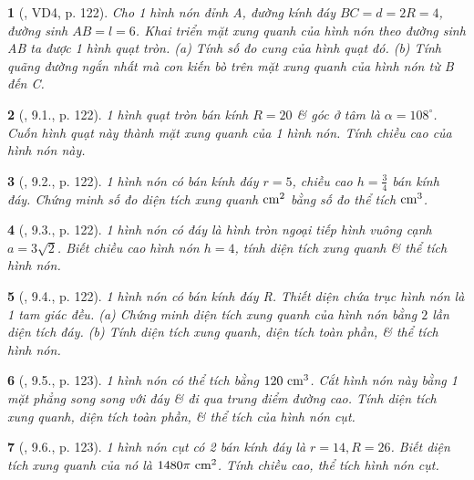 \documentclass{article}
\newtheorem{baitoan}{}
\begin{document}
\begin{baitoan}[\cite{Binh_boi_duong_Toan_9_tap_2}, VD4, p. 122]
	Cho 1 hình nón đỉnh A, đường kính đáy $BC = d = 2R = 4$, đường sinh $AB = l = 6$. Khai triển mặt xung quanh của hình nón theo đường sinh AB ta được 1 hình quạt tròn. (a) Tính số đo cung của hình quạt đó. (b) Tính quãng đường ngắn nhất mà con kiến bò trên mặt xung quanh của hình nón từ B đến C.
\end{baitoan}

\begin{baitoan}[\cite{Binh_boi_duong_Toan_9_tap_2}, 9.1., p. 122]
	1 hình quạt tròn bán kính $R = 20$ \& góc ở tâm là $\alpha = 108^\circ$. Cuốn hình quạt này thành mặt xung quanh của 1 hình nón. Tính chiều cao của hình nón này.
\end{baitoan}

\begin{baitoan}[\cite{Binh_boi_duong_Toan_9_tap_2}, 9.2., p. 122]
	1 hình nón có bán kính đáy $r = 5$, chiều cao $h = \frac{3}{4}$ bán kính đáy. Chứng minh số đo diện tích xung quanh $\rm cm^2$ bằng số đo thể tích $\rm cm^3$.
\end{baitoan}

\begin{baitoan}[\cite{Binh_boi_duong_Toan_9_tap_2}, 9.3., p. 122]
	1 hình nón có đáy là hình tròn ngoại tiếp hình vuông cạnh $a = 3\sqrt{2}$. Biết chiều cao hình nón $h = 4$, tính diện tích xung quanh \& thể tích hình nón.
\end{baitoan}

\begin{baitoan}[\cite{Binh_boi_duong_Toan_9_tap_2}, 9.4., p. 122]
	1 hình nón có bán kính đáy R. Thiết diện chứa trục hình nón là 1 tam giác đều. (a) Chứng minh diện tích xung quanh của hình nón bằng $2$ lần diện tích đáy. (b) Tính diện tích xung quanh, diện tích toàn phần, \& thể tích hình nón.
\end{baitoan}

\begin{baitoan}[\cite{Binh_boi_duong_Toan_9_tap_2}, 9.5., p. 123]
	1 hình nón có thể tích bằng $\rm120\ cm^3$. Cắt hình nón này bằng 1 mặt phẳng song song với đáy \& đi qua trung điểm đường cao. Tính diện tích xung quanh, diện tích toàn phần, \& thể tích của hình nón cụt.
\end{baitoan}

\begin{baitoan}[\cite{Binh_boi_duong_Toan_9_tap_2}, 9.6., p. 123]
	1 hình nón cụt có 2 bán kính đáy là $r = 14,R = 26$. Biết diện tích xung quanh của nó là $\rm1480\pi\ cm^2$. Tính chiều cao, thể tích hình nón cụt.
\end{baitoan}
\end{document}
